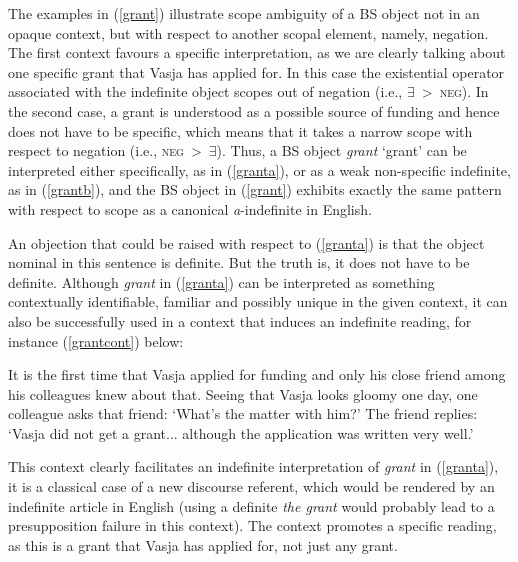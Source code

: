 \documentclass[output=paper,colorlinks,citecolor=brown]{langscibook}
\begin{document}
\noindent The examples in (\ref{grant}) illustrate scope ambiguity of a BS object not in an opaque context, but with respect to another scopal element, namely, negation. The first context favours a specific interpretation, as we are clearly talking about one specific grant that Vasja has applied for. In this case the existential operator associated with the indefinite object scopes out of negation (i.e., $\exists$~\textgreater~\textsc{neg}). In the second case, a grant is understood as a possible source of funding and hence does not have to be specific, which means that it takes a narrow scope with respect to negation (i.e., \textsc{neg}~\textgreater~$\exists$). Thus, a BS object \textit{grant} `grant' can be interpreted either specifically, as in (\ref{granta}), or as a weak non-specific indefinite, as in (\ref{grantb}), and the BS object in (\ref{grant}) exhibits exactly the same pattern with respect to scope as a canonical \textit{a}-indefinite in English.  

An objection that could be raised with respect to (\ref{granta}) is that the object nominal in this sentence is definite. But the truth is, it does not have to be definite. Although \textit{grant} in (\ref{granta}) can be interpreted as something contextually identifiable, familiar and possibly unique in the given context, it can also be successfully used in a context that induces an indefinite reading, for instance (\ref{grantcont}) below: 

\eanoraggedright It is the first time that Vasja applied for funding and only his close friend among his colleagues knew about that. Seeing that Vasja looks gloomy one day, one colleague asks that friend: `What's the matter with him?' The friend replies: `Vasja did not get a grant... although the application was written very well.' \label{grantcont}
\z

\noindent This context clearly facilitates an indefinite interpretation of \textit{grant} in (\ref{granta}), it is a classical case of a new discourse referent, which would be rendered by an indefinite article in English (using a definite \textit{the grant} would probably lead to a presupposition failure in this context). The context promotes a specific reading, as this is a grant that Vasja has applied for, not just any grant. 
\end{document}
